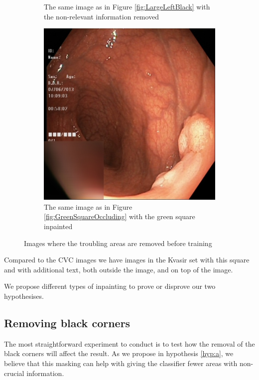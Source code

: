 \begin{figure}
\begin{subfigure}[b]{0.4\textwidth}
         \caption{The same image as in Figure \ref{fig:LargeLeftBlack} with the non-relevant information removed}
         \label{fig:LargeLeftBlackFIX}
     \end{subfigure}
     \hfill
     \begin{subfigure}[b]{0.4\textwidth}
         \centering
         \includegraphics[width=\textwidth]{experiments/figures/nogreenframe.jpg}
         \caption{The same image as in Figure \ref{fig:GreenSquareOccluding} with the green square inpainted}
         \label{fig:GreenSquareOccludingFIX}
     \end{subfigure}
        \caption{Images where the troubling areas are removed before training}
        \label{fig:KvasirAnomaliesFIX}
\end{figure}



Compared to the CVC images we have images in the Kvasir set with this square and with additional text, both outside the image, and on top of the image.  

We propose different types of inpainting to prove or disprove our two hypothesises.

\subsection{Removing black corners}
The most straightforward experiment to conduct is to test how the removal of the black corners will affect the result.
As we propose in hypothesis \ref{hyp:a}, we believe that this masking can help with giving the classifier fewer areas with non-crucial information.

